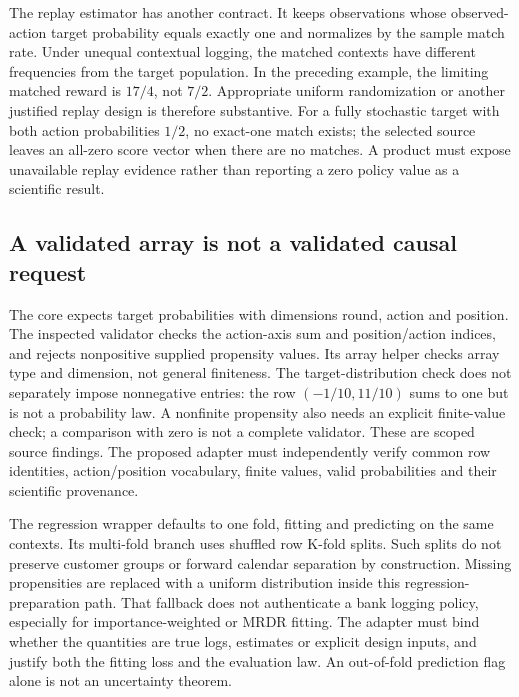 The replay estimator has another contract. It keeps observations whose
observed-action target probability equals exactly one and normalizes by the
sample match rate. Under unequal contextual logging, the matched contexts have
different frequencies from the target population. In the preceding example,
the limiting matched reward is $17/4$, not $7/2$. Appropriate uniform
randomization or another justified replay design is therefore substantive.
For a fully stochastic target with both action probabilities $1/2$, no exact-one
match exists; the selected source leaves an all-zero score vector when there
are no matches. A product must expose unavailable replay evidence rather than
reporting a zero policy value as a scientific result.
\cite{exec23_obp_sources,exec23_obp_reference}

\subsection{A validated array is not a validated causal request}
\label{exec23:obp-uncertainty}
The core expects target probabilities with dimensions round, action and
position. The inspected validator checks the action-axis sum and position/action
indices, and rejects nonpositive supplied propensity values. Its array helper
checks array type and dimension, not general finiteness. The target-distribution
check does not separately impose nonnegative entries: the row
$(-1/10,11/10)$ sums to one but is not a probability law. A nonfinite propensity
also needs an explicit finite-value check; a comparison with zero is not a
complete validator. These are scoped source findings. The proposed adapter
must independently verify common row identities, action/position vocabulary,
finite values, valid probabilities and their scientific provenance.
\cite{exec23_obp_sources,exec23_obp_reference}

The regression wrapper defaults to one fold, fitting and predicting on the
same contexts. Its multi-fold branch uses shuffled row K-fold splits. Such
splits do not preserve customer groups or forward calendar separation by
construction. Missing propensities are replaced with a uniform distribution
inside this regression-preparation path. That fallback does not authenticate a
bank logging policy, especially for importance-weighted or MRDR fitting. The
adapter must bind whether the quantities are true logs, estimates or explicit
design inputs, and justify both the fitting loss and the evaluation law. An
out-of-fold prediction flag alone is not an uncertainty theorem.
\cite{exec23_obp_sources}

